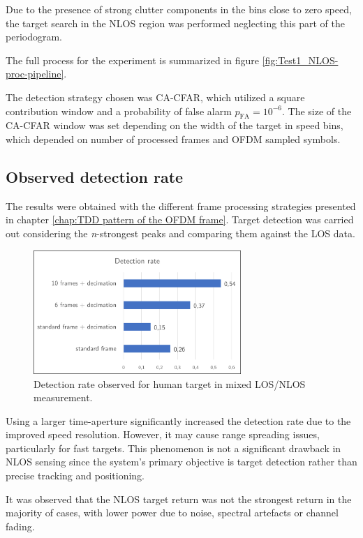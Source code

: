 Due to the presence of strong clutter components in the bins close to zero speed, the target search in the NLOS region was performed neglecting this part of the periodogram.

The full process for the experiment is summarized in figure \ref{fig:Test1_NLOS-proc-pipeline}.

The detection strategy chosen was CA-CFAR, which utilized a square contribution window and a probability of false alarm $p_{\text{FA}} = 10^{-6}$. The size of the CA-CFAR window was set depending on the width of the target in speed bins, which depended on number of processed frames and OFDM sampled symbols.  

\subsection{Observed detection rate}

The results were obtained with the different frame processing strategies presented in chapter \ref{chap:TDD pattern of the OFDM frame}. Target detection was carried out considering the \textit{n}-strongest peaks and comparing them against the LOS data.

\begin{figure}[H]
	\centering
	\includegraphics[width=0.7\textwidth]{Images/Test1/detect_hist.png}
	\caption{Detection rate observed for human target in mixed LOS/NLOS measurement.}
	\label{fig:Test1_detect_hist}
\end{figure}

Using a larger time-aperture significantly increased the detection rate due to the improved speed resolution. However, it may cause range spreading issues, particularly for fast targets. This phenomenon is not a significant drawback in NLOS sensing since the system's primary objective is target detection rather than precise tracking and positioning.

It was observed that the NLOS target return was not the strongest return in the majority of cases, with lower power due to noise, spectral artefacts or channel fading.

